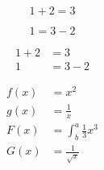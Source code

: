 \documentclass{article}
\begin{document}
\begin{equation*}
	1 + 2 = 3
\end{equation*}

\begin{equation*}
	1 = 3 - 2
\end{equation*}

\begin{align*}
	1 + 2 &= 3\\
	1 &= 3 - 2
\end{align*}

\begin{align*}
	f(x) &= x^2\\
	g(x) &= \frac{1}{x}\\
	F(x) &= \int^a_b \frac{1}{3}x^3\\
	G(x) &= \frac{1}{\sqrt{x}}
\end{align*}
\end{document}
